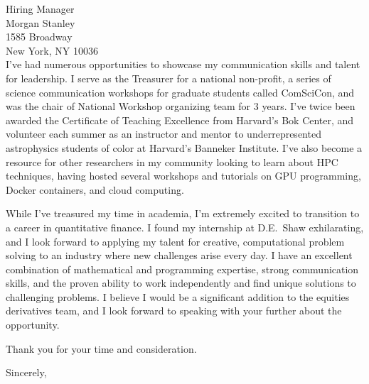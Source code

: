 \documentclass{letter}
\begin{document}
\begin{letter}{Hiring Manager\\
    Morgan Stanley\\ 1585 Broadway\\New York, NY 10036\\ }
\noindent I've had numerous opportunities to showcase my communication skills
and talent for leadership. I serve as the Treasurer for a national
non-profit, a series of science communication workshops for graduate students
called ComSciCon, and was the chair of National Workshop organizing team for 3
years. I've twice been awarded the Certificate of Teaching Excellence from
Harvard's Bok Center, and volunteer each summer as an instructor and mentor to
underrepresented astrophysics students of color at Harvard's Banneker
Institute. I've also become a resource for other researchers in my community
looking to learn about HPC techniques, having hosted several workshops and
tutorials on GPU programming, Docker containers, and cloud computing.

\noindent While I've treasured my time in academia, I'm extremely excited to
transition to a career in quantitative finance. I found my internship at
D.E.~Shaw exhilarating, and I look forward to applying my talent for creative,
computational problem solving to an industry where new challenges arise every
day. I have an excellent combination of mathematical and programming
expertise, strong communication skills, and the proven ability to work
independently and find unique solutions to challenging problems. I believe I
would be a significant addition to the equities derivatives team, and I look forward to
speaking with your further about the opportunity.

Thank you for your time and consideration.

\closing{Sincerely,}

\end{letter}
\end{document}
